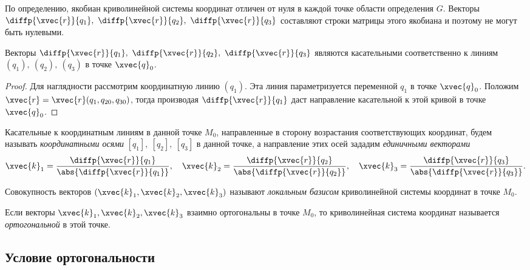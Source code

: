 По определению, якобиан криволинейной системы координат отличен от нуля в
каждой точке области определения $G$. Векторы
$\diffp{\xvec{r}}{{q_1}},~\diffp{\xvec{r}}{{q_2}},~\diffp{\xvec{r}}{{q_3}}$
составляют строки матрицы этого якобиана и поэтому не могут быть нулевыми.

\begin{theorem}
  Векторы
  $\diffp{\xvec{r}}{{q_1}},~\diffp{\xvec{r}}{{q_2}},~\diffp{\xvec{r}}{{q_3}}$
  являются касательными соответственно к линиям
  $(q_1),~(q_2),~(q_3)$ в точке $\xvec{q}_0$.
\end{theorem}

\begin{proof}
  Для наглядности рассмотрим координатную линию $(q_1)$. Эта линия
  параметризуется переменной $q_1$ в точке $\xvec{q}_0$. Положим
  $\xvec{r} = \xvec{r}(q_1, q_{20}, q_{30})$, тогда производая
  $\diffp{\xvec{r}}{{q_1}}$ даст направление касательной к этой кривой в точке
  $\xvec{q}_0$.
\end{proof}

Касательные к координатным линиям в данной точке $M_0$, направленные в сторону
возрастания соответствующих координат, будем называть \textit{координатными
осями} $[q_1],~[q_2],~[q_3]$ в данной точке, а направление этих осей зададим
\textit{единичными векторами}
\begin{equation*}
    \xvec{k}_1 =
      \frac
        {\diffp{\xvec{r}}{{q_1}}}
        {\abs{\diffp{\xvec{r}}{{q_1}}}}, \quad
    \xvec{k}_2 =
      \frac
        {\diffp{\xvec{r}}{{q_2}}}
        {\abs{\diffp{\xvec{r}}{{q_2}}}}, \quad
    \xvec{k}_3 =
      \frac
        {\diffp{\xvec{r}}{{q_3}}}
        {\abs{\diffp{\xvec{r}}{{q_3}}}}.
\end{equation*}

\begin{definition}
  Совокупность векторов $(\xvec{k}_1, \xvec{k}_2, \xvec{k}_3)$ называют
  \textit{локальным базисом} криволинейной системы координат в точке $M_0$.
\end{definition}

\begin{definition}
  Если векторы $\xvec{k}_1, \xvec{k}_2, \xvec{k}_3$ взаимно ортогональны в точке
  $M_0$, то криволинейная система координат называется \textit{ортогональной} в
  этой точке.
\end{definition}

\subsection{Условие ортогональности}

